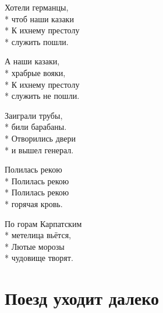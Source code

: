 \medskip

\begin{minipage}{\linewidth}
Хотели германцы,\\*
чтоб наши казаки\\*
К ихнему престолу\\*
служить пошли.\\
\end{minipage}\par\medskip\nobreak

\medskip

\begin{minipage}{\linewidth}
А наши казаки,\\*
храбрые вояки,\\*
К ихнему престолу\\*
служить не пошли.\\
\end{minipage}\par\medskip\nobreak

\medskip

\begin{minipage}{\linewidth}
Заиграли трубы,\\*
били барабаны.\\*
Отворились двери\\*
и вышел генерал.\\
\end{minipage}\par\medskip\nobreak

\medskip

\begin{minipage}{\linewidth}
Полилась рекою\\*
Полилась рекою\\*
Полилась рекою\\*
горячая кровь.\\
\end{minipage}\par\medskip\nobreak

\medskip

\begin{minipage}{\linewidth}
По горам Карпатским\\*
метелица вьётся,\\*
Лютые морозы\\*
чудовище творят.\\
\end{minipage}

\vspace{\fill}\newpage

\section{Поезд уходит далеко}
\label{song:Поезд_уходит_далеко}

